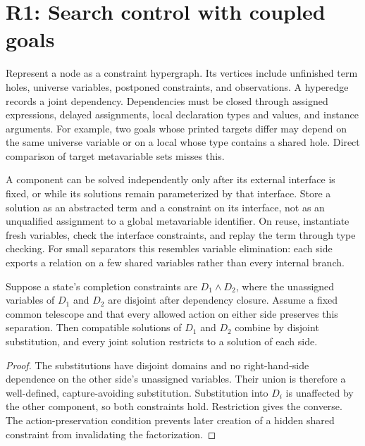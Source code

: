\section{R1: Search control with coupled goals}\label{sec:r1}


Represent a node as a constraint hypergraph. Its vertices include unfinished
term holes, universe variables, postponed constraints, and observations.
A hyperedge records a joint dependency. Dependencies must be closed through
assigned expressions, delayed assignments, local declaration types and values,
and instance arguments. For example, two goals whose printed targets differ
may depend on the same universe variable or on a local whose type contains a
shared hole. Direct comparison of target metavariable sets misses this.

A component can be solved independently only after its external interface is
fixed, or while its solutions remain parameterized by that interface. Store a
solution as an abstracted term and a constraint on its interface, not as an
unqualified assignment to a global metavariable identifier. On reuse,
instantiate fresh variables, check the interface constraints, and replay the
term through type checking. For small separators this resembles variable
elimination: each side exports a relation on a few shared variables rather
than every internal branch.

\begin{proposition}\label{prop:factor}
Suppose a state's completion constraints are $D_1\land D_2$, where the
unassigned variables of $D_1$ and $D_2$ are disjoint after dependency closure.
Assume a fixed common telescope and that every allowed action on either side
preserves this separation. Then compatible solutions of $D_1$ and $D_2$
combine by disjoint substitution, and every joint solution restricts to a
solution of each side.
\end{proposition}
\begin{proof}
The substitutions have disjoint domains and no right-hand-side dependence on
the other side's unassigned variables. Their union is therefore a well-defined,
capture-avoiding substitution. Substitution into $D_i$ is unaffected by the
other component, so both constraints hold. Restriction gives the converse.
The action-preservation condition prevents later creation of a hidden shared
constraint from invalidating the factorization.
\end{proof}

